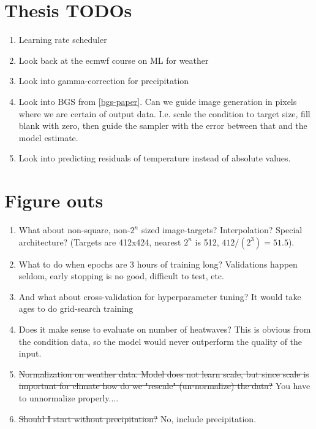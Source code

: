 \section*{Thesis TODOs}

\begin{enumerate}
    \item Learning rate scheduler
    \item Look back at the ecmwf course on ML for weather
    \item Look into gamma-correction for precipitation
    \item Look into BGS from \autoref{bgs-paper}. Can we guide image generation in pixels where we are certain of output data. I.e. scale the condition to target size, fill blank with zero, then guide the sampler with the error between that and the model estimate.
    \item Look into predicting residuals of temperature instead of absolute values.
\end{enumerate}

\section*{Figure outs}
\begin{enumerate}
    \item What about non-square, non-$2^n$ sized image-targets? Interpolation? Special architecture? (Targets are 412x424, nearest $2^n$ is 512, $412/(2^3)=51.5$).
    \item What to do when epochs are 3 hours of training long? Validations happen seldom, early stopping is no good, difficult to test, etc.
    \item And what about cross-validation for hyperparameter tuning? It would take ages to do grid-search training
    \item Does it make sense to evaluate on number of heatwaves? This is obvious from the condition data, so the model would never outperform the quality of the input.
    \item \st{Normalization on weather data. Model does not learn scale, but since scale is important for climate how do we "rescale" (un-normalize) the data?} You have to unnormalize properly....
    \item \st{Should I start without precipitation?} No, include precipitation.
\end{enumerate}

